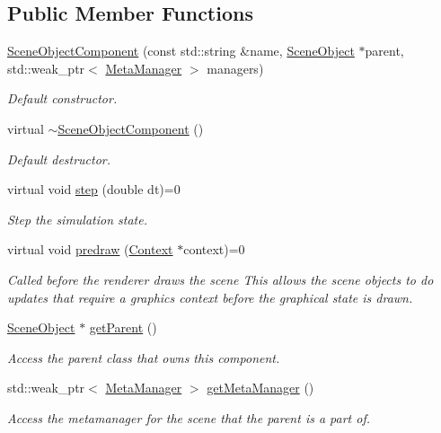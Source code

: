 \subsection*{Public Member Functions}
\begin{DoxyCompactItemize}
\item 
\hyperlink{class_scene_object_component_a8bcfb5bc3d3bdb01faa9ad1286b8585f}{Scene\+Object\+Component} (const std\+::string \&name, \hyperlink{class_scene_object}{Scene\+Object} $\ast$parent, std\+::weak\+\_\+ptr$<$ \hyperlink{class_meta_manager}{Meta\+Manager} $>$ managers)
\begin{DoxyCompactList}\small\item\em Default constructor. \end{DoxyCompactList}\item 
virtual \hyperlink{class_scene_object_component_a2832eebdd71efb588d47be60ba95e49f}{$\sim$\+Scene\+Object\+Component} ()
\begin{DoxyCompactList}\small\item\em Default destructor. \end{DoxyCompactList}\item 
virtual void \hyperlink{class_scene_object_component_a99ebed011a6547be4d31a09927e3b810}{step} (double dt)=0
\begin{DoxyCompactList}\small\item\em Step the simulation state. \end{DoxyCompactList}\item 
virtual void \hyperlink{class_scene_object_component_a7110e37ad23a708c2bf9828c7fd7df2f}{predraw} (\hyperlink{class_context}{Context} $\ast$context)=0
\begin{DoxyCompactList}\small\item\em Called before the renderer draws the scene This allows the scene objects to do updates that require a graphics context before the graphical state is drawn. \end{DoxyCompactList}\item 
\hyperlink{class_scene_object}{Scene\+Object} $\ast$ \hyperlink{class_scene_object_component_ab4e4f580e5257b8f9064f7b594b97ac9}{get\+Parent} ()
\begin{DoxyCompactList}\small\item\em Access the parent class that owns this component. \end{DoxyCompactList}\item 
std\+::weak\+\_\+ptr$<$ \hyperlink{class_meta_manager}{Meta\+Manager} $>$ \hyperlink{class_scene_object_component_a6b2b0732ce70a245bbea15d6ad58f35d}{get\+Meta\+Manager} ()
\begin{DoxyCompactList}\small\item\em Access the metamanager for the scene that the parent is a part of. \end{DoxyCompactList}\end{DoxyCompactItemize}
